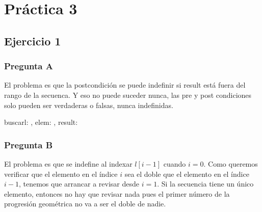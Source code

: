 
\usepackage{caratula}
\usepackage{enumerate}
\usepackage{hyperref}

\decimalpoint
\setlength{\parindent}{0em}
\setlength{\parskip}{0.5em}
\hypersetup{colorlinks=true, linkcolor=black, urlcolor=blue}
\setcounter{tocdepth}{2}




\maketitle

\tableofcontents
\newpage

\section{Práctica 3}

\subsection{Ejercicio 1}

\subsubsection{Pregunta A}

El problema es que la postcondición se puede indefinir si result está fuera del rango de la secuenca. Y eso no puede suceder nunca, las pre y post condiciones solo pueden ser verdaderas o falsas, nunca indefinidas.

\begin{proc}{buscar}{\In l: \TLista{\float}, \In elem: \float, \Out result: \ent}{}
\end{proc}

\subsubsection{Pregunta B}

El problema es que se indefine al indexar $l[i-1]$ cuando $i=0$. Como queremos verificar que el elemento en el índice $i$ sea el doble que el elemento en el índice $i-1$, tenemos que arrancar a revisar desde $i=1$. Si la secuencia tiene un único elemento, entonces no hay que revisar nada pues el primer número de la progresión geométrica no va a ser el doble de nadie.

